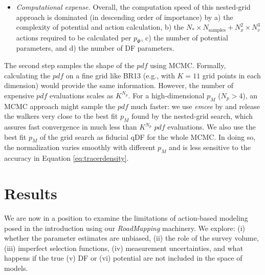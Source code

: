 \documentclass[iop,revtex4,numberedappendix,appendixfloats]{emulateapj}
\newcommand{\pdf}{\ensuremath{pdf}}
\newcommand{\pmodel}{\ensuremath{p_M}}
\newcommand{\RM}{{\sl RoadMapping}}
\begin{document}
\begin{itemize}
\item \emph{Computational expense.} Overall, the computation speed of this nested-grid approach is dominated (in descending order of importance) by a) the complexity of potential and action calculation, b) the $N_* \times N_\text{samples} + N_x^2 \times N_v^3$ actions required to be calculated per $p_\Phi$, c) the number of potential parameters, and d) the number of DF parameters.
\end{itemize}

The second step samples the shape of the \pdf{} using MCMC. Formally, calculating the \pdf{} on a fine grid like BR13 (e.g., with $K=11$ grid points in each dimension) would provide the same information. However, the number of expensive \pdf{} evaluations scales as $K^{N_p}$. For a high-dimensional \pmodel{} ($N_p>4$), an MCMC approach might sample the \pdf{} much faster: we use \emph{emcee} by \citet{2013PASP..125..306F} and release the walkers very close to the best fit \pmodel{} found by the nested-grid search, which assures fast convergence in much less than $K^{N_p}$ \pdf{} evaluations. We also use the best fit \pmodel{} of the grid search as fiducial qDF for the whole MCMC. In doing so, the normalization varies smoothly with different $\pmodel{}$ and is less sensitive to the accuracy in Equation \eqref{eq:tracerdensity}.


\section{Results} \label{sec:results}

We are now in a position to examine the limitations of action-based modeling posed in the introduction using our \RM{} machinery. We explore: (i) whether the parameter estimates are unbiased, (ii) the role of the survey volume, (iii) imperfect selection functions, (iv) measurement uncertainties, and what happens if the true (v) DF or (vi) potential are not included in the space of models. 
\end{document}
